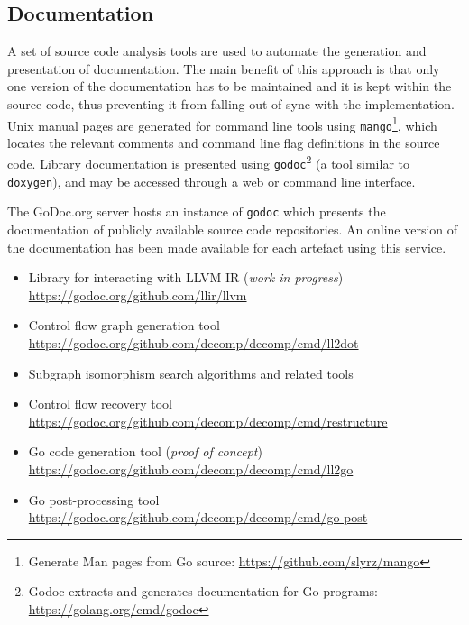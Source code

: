 
\subsection{Documentation}

A set of source code analysis tools are used to automate the generation and presentation of documentation. The main benefit of this approach is that only one version of the documentation has to be maintained and it is kept within the source code, thus preventing it from falling out of sync with the implementation. Unix manual pages are generated for command line tools using \texttt{mango}\footnote{Generate Man pages from Go source: \url{https://github.com/slyrz/mango}}, which locates the relevant comments and command line flag definitions in the source code. Library documentation is presented using \texttt{godoc}\footnote{Godoc extracts and generates documentation for Go programs: \url{https://golang.org/cmd/godoc}} (a tool similar to \texttt{doxygen}), and may be accessed through a web or command line interface.

The GoDoc.org server hosts an instance of \texttt{godoc} which presents the documentation of publicly available source code repositories. An online version of the documentation has been made available for each artefact using this service.

\begin{itemize}
	\item Library for interacting with LLVM IR (\textit{work in progress}) \\ \url{https://godoc.org/github.com/llir/llvm}
	\item Control flow graph generation tool \\ \url{https://godoc.org/github.com/decomp/decomp/cmd/ll2dot}
	\item Subgraph isomorphism search algorithms and related tools
	\item Control flow recovery tool \\ \url{https://godoc.org/github.com/decomp/decomp/cmd/restructure}
	\item Go code generation tool (\textit{proof of concept}) \\ \url{https://godoc.org/github.com/decomp/decomp/cmd/ll2go}
	\item Go post-processing tool \\ \url{https://godoc.org/github.com/decomp/decomp/cmd/go-post}
\end{itemize}

